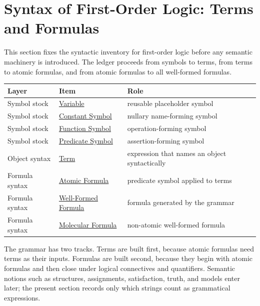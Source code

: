 
\section{Syntax of First-Order Logic: Terms and Formulas}

\begin{remark*}
This section fixes the syntactic inventory for first-order logic before any
semantic machinery is introduced. The ledger proceeds from symbols to terms,
from terms to atomic formulas, and from atomic formulas to all well-formed
formulas.

\begin{center}
\small
\begin{tabular}{l l l}
\toprule
\textbf{Layer} & \textbf{Item} & \textbf{Role} \\
\midrule
Symbol stock & \hyperref[def:variable]{Variable} & reusable placeholder symbol \\
Symbol stock & \hyperref[def:constant-symbol]{Constant Symbol} & nullary name-forming symbol \\
Symbol stock & \hyperref[def:function-symbol]{Function Symbol} & operation-forming symbol \\
Symbol stock & \hyperref[def:predicate-symbol]{Predicate Symbol} & assertion-forming symbol \\
Object syntax & \hyperref[def:term]{Term} & expression that names an object syntactically \\
Formula syntax & \hyperref[def:atomic-formula]{Atomic Formula} & predicate symbol applied to terms \\
Formula syntax & \hyperref[def:wff-pred]{Well-Formed Formula} & formula generated by the grammar \\
Formula syntax & \hyperref[def:molecular]{Molecular Formula} & non-atomic well-formed formula \\
\bottomrule
\end{tabular}
\end{center}
\end{remark*}

\begin{remark*}[Exposition]
The grammar has two tracks. Terms are built first, because atomic formulas need
terms as their inputs. Formulas are built second, because they begin with atomic
formulas and then close under logical connectives and quantifiers. Semantic
notions such as structures, assignments, satisfaction, truth, and models enter
later; the present section records only which strings count as grammatical
expressions.
\end{remark*}

